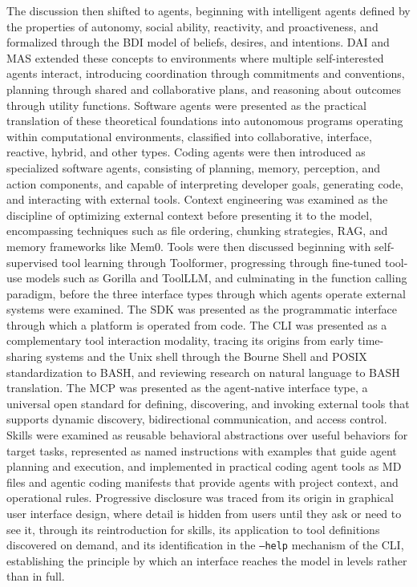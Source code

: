 \documentclass[
english,                 %
bibtex,                  %
]{kththesis}
\numberwithin{listing}{chapter}
\begin{document}
The discussion then shifted to agents, beginning with intelligent agents defined by the properties of autonomy, social ability, reactivity, and proactiveness, and formalized through the \gls{BDI} model of beliefs, desires, and intentions. \Gls{DAI} and \gls{MAS} extended these concepts to environments where multiple self-interested agents interact, introducing coordination through commitments and conventions, planning through shared and collaborative plans, and reasoning about outcomes through utility functions. Software agents were presented as the practical translation of these theoretical foundations into autonomous programs operating within computational environments, classified into collaborative, interface, reactive, hybrid, and other types. Coding agents were then introduced as specialized software agents, consisting of planning, memory, perception, and action components, and capable of interpreting developer goals, generating code, and interacting with external tools. Context engineering was examined as the discipline of optimizing external context before presenting it to the model, encompassing techniques such as file ordering, chunking strategies, \gls{RAG}, and memory frameworks like Mem0. Tools were then discussed beginning with self-supervised tool learning through Toolformer, progressing through fine-tuned tool-use models such as Gorilla and Tool\gls{LLM}, and culminating in the function calling paradigm, before the three interface types through which agents operate external systems were examined. The \gls{SDK} was presented as the programmatic interface through which a platform is operated from code. The \gls{CLI} was presented as a complementary tool interaction modality, tracing its origins from early time-sharing systems and the Unix shell through the Bourne Shell and \gls{POSIX} standardization to \gls{BASH}, and reviewing research on natural language to \gls{BASH} translation. The \gls{MCP} was presented as the agent-native interface type, a universal open standard for defining, discovering, and invoking external tools that supports dynamic discovery, bidirectional communication, and access control. Skills were examined as reusable behavioral abstractions over useful behaviors for target tasks, represented as named instructions with examples that guide agent planning and execution, and implemented in practical coding agent tools as \gls{MD} files and agentic coding manifests that provide agents with project context, and operational rules. Progressive disclosure was traced from its origin in graphical user interface design, where detail is hidden from users until they ask or need to see it, through its reintroduction for skills, its application to tool definitions discovered on demand, and its identification in the \texttt{--help} mechanism of the \gls{CLI}, establishing the principle by which an interface reaches the model in levels rather than in full.
\end{document}
